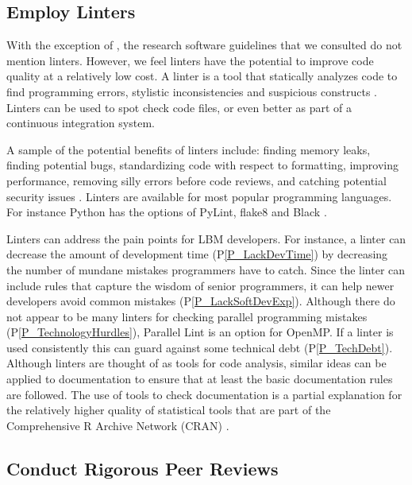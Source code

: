 \documentclass[final, 3p, times, authoryear]{elsarticle}
\newcommand{\ppref}[1]{P\ref{#1}}
\begin{document}
\subsection{Employ Linters} \label{Sec_Linters}

With the exception of \citet{ThielEtAl2020}, the research software guidelines
that we consulted do not mention linters.  However, we feel linters have the
potential to improve code quality at a relatively low cost.  A linter is a tool
that statically analyzes code to find programming errors, stylistic
inconsistencies and suspicious constructs \citep{Wikipedia2022_Lint}. Linters
can be used to spot check code files, or even better as part of a continuous
integration system.  

A sample of the potential benefits of linters include: finding memory leaks,
finding potential bugs, standardizing code with respect to formatting, improving
performance, removing silly errors before code reviews, and catching potential
security issues \citep{SourceLevel2022_Lint}.  Linters are available for most
popular programming languages.  For instance Python has the options of PyLint,
flake8 and Black \citep{Zadka2018}.

Linters can address the pain points for LBM developers.  For instance, a linter
can decrease the amount of development time (\ppref{P_LackDevTime}) by
decreasing the number of mundane mistakes programmers have to catch.  Since the
linter can include rules that capture the wisdom of senior programmers, it can
help newer developers avoid common mistakes (\ppref{P_LackSoftDevExp}).  Although
there do not appear to be many linters for checking parallel programming
mistakes (\ppref{P_TechnologyHurdles}), Parallel Lint is an option for OpenMP.
If a linter is used consistently this can guard against some technical debt
(\ppref{P_TechDebt}). Although linters are thought of as tools for code
analysis, similar ideas can be applied to documentation to ensure that at least
the basic documentation rules are followed.  The use of tools to check
documentation is a partial explanation for the relatively higher quality of
statistical tools that are part of the Comprehensive R Archive Network (CRAN)
\citep{SmithEtAl2018_StatSoft}.

\subsection{Conduct Rigorous Peer Reviews}
\end{document}
